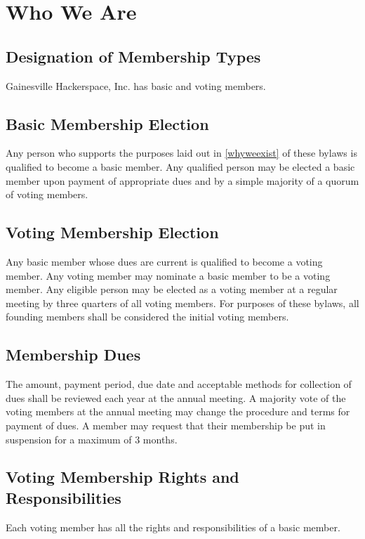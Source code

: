 \documentclass[10pt,letterpaper,titlepage]{article}
\newcommand\corpname{Gainesville Hackerspace, Inc.}
\begin{document}
\section{Who We Are}

\subsection{Designation of Membership Types}

\corpname{} has basic and voting members.

\subsection{Basic Membership Election}

Any person who supports the purposes laid out in \ref{whyweexist} of
these bylaws is qualified to become a basic member.  Any qualified person
may be elected a basic member upon payment of appropriate dues and by a simple
majority of a quorum of voting members.


\subsection{Voting Membership Election}

Any basic member whose dues are current is qualified to become a voting
member. Any voting member may nominate a basic member to be a voting
member. Any eligible person may be elected as a voting member at a
regular meeting by three quarters of all voting members.
For purposes of these bylaws, all founding members shall be considered
the initial voting members.


\subsection{Membership Dues}
\label{votmemdue}

The amount, payment period, due date and acceptable methods for collection of
dues shall be reviewed each year at the annual meeting.
A majority vote of the voting members at the annual meeting may change the procedure
and terms for payment of dues.
A member may request that their membership be put in suspension for a maximum
of 3 months.

\subsection{Voting Membership Rights and Responsibilities}
Each voting member has all the rights and responsibilities of a basic member.
\end{document}
